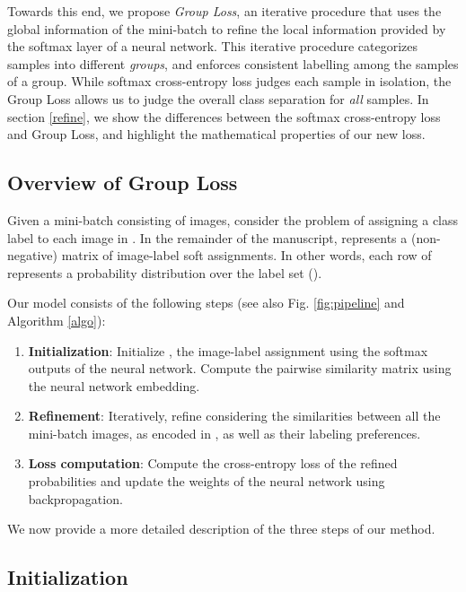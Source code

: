 \documentclass[runningheads]{llncs}
\newcommand*\circled[1]{\raisebox{.5pt}{\textcircled{\raisebox{-1.1pt} {#1}}}}
\begin{document}
Towards this end, we propose {\it Group Loss}, an iterative procedure that uses the global information of the mini-batch to refine the local information provided by the softmax layer of a neural network.
This iterative procedure categorizes samples into different \textit{groups}, and enforces consistent labelling among the samples of a group.
While softmax cross-entropy loss judges each sample in isolation, the Group Loss allows us to judge the overall class separation for {\it all} samples.
In section \ref{refine}, we show the differences between the softmax cross-entropy loss and Group Loss, and highlight the mathematical properties of our new loss.


\subsection{Overview of Group Loss}\label{sec:gl_overview}

Given a mini-batch  consisting of  images, consider the problem of assigning a class label  to each image in . 
In the remainder of the manuscript,  represents a  (non-negative) matrix of image-label soft assignments. In other words, each row of  represents a probability distribution over the label set  (). 

Our model consists of the following steps (see also Fig. \ref{fig:pipeline} and Algorithm \ref{algo}):

\begin{enumerate}[label=\protect\circled{\arabic*}]
    \item \textbf{Initialization}: Initialize , the image-label assignment using the softmax outputs of the neural network. Compute the  pairwise similarity matrix  using the neural network embedding.
    \item \textbf{Refinement}: Iteratively, refine  considering the similarities between all the mini-batch images, as encoded in , as well as their labeling preferences.
    \item \textbf{Loss computation}: Compute the cross-entropy loss of the refined probabilities and update the weights of the neural network using backpropagation.
\end{enumerate}

We now provide a more detailed description of the three steps of our method.

\subsection{Initialization}
\end{document}
